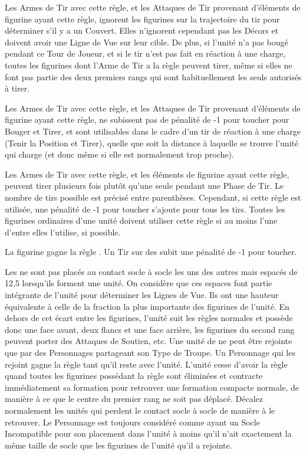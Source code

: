 Les Armes de Tir avec cette règle, et les Attaques de Tir provenant d'éléments de figurine ayant cette règle, ignorent les figurines sur la trajectoire du tir pour déterminer s'il y a un Couvert. Elles n'ignorent cependant pas les Décors et doivent avoir une Ligne de Vue sur leur cible. De plus, si l'unité n'a pas bougé pendant ce Tour de Joueur, et si le tir n'est pas fait en réaction à une charge, toutes les figurines dont l'Arme de Tir a la règle \volleyfire{} peuvent tirer, même si elles ne font pas partie des deux premiers rangs qui sont habituellement les seuls autorisés à tirer.


Les Armes de Tir avec cette règle, et les Attaques de Tir provenant d'éléments de figurine ayant cette règle, ne subissent pas de pénalité de -1 pour toucher pour Bouger et Tirer, et sont utilisables dans le cadre d'un tir de réaction à une charge (Tenir la Position et Tirer), quelle que soit la distance à laquelle se trouve l'unité qui charge (et donc même si elle est normalement trop proche).


Les Armes de Tir avec cette règle, et les éléments de figurine ayant cette règle, peuvent tirer plusieurs fois plutôt qu'une seule pendant une Phase de Tir. Le nombre de tirs possible est précisé entre parenthèses. Cependant, si cette règle est utilisée, une pénalité de -1 pour toucher s'ajoute pour tous les tirs. Toutes les figurines ordinaires d'une unité doivent utiliser cette règle si au moins l'une d'entre elles l'utilise, si possible.


La figurine gagne la règle \lighttroops{}. Un Tir sur des \skirmishers{} subit une pénalité de -1 pour toucher.

Les \skirmishers{} ne sont pas placés au contact socle à socle les uns des autres mais espacés de 12,5\unit{}{\milli\meter} lorsqu'ils forment une unité. On considère que ces espaces font partie intégrante de l'unité pour déterminer les Lignes de Vue. Ils ont une hauteur équivalente à celle de la fraction la plus importante des figurines de l'unité. En dehors de cet écart entre les figurines, l'unité suit les règles normales et possède donc une face avant, deux flancs et une face arrière, les figurines du second rang peuvent porter des Attaques de Soutien, etc. Une unité de \skirmishers{} ne peut être rejointe que par des Personnages partageant son Type de Troupe. Un Personnage qui les rejoint gagne la règle \skirmisher{} tant qu'il reste avec l'unité. L'unité cesse d'avoir la règle \skirmisher{} quand toutes les figurines possédant la règle sont éliminées et contracte immédiatement sa formation pour retrouver une formation compacte normale, de manière à ce que le centre du premier rang ne soit pas déplacé. Décalez normalement les unités qui perdent le contact socle à socle de manière à le retrouver. Le Personnage est toujours considéré comme ayant un Socle Incompatible pour son placement dans l'unité à moins qu'il n'ait exactement la même taille de socle que les figurines de l'unité qu'il a rejointe.

